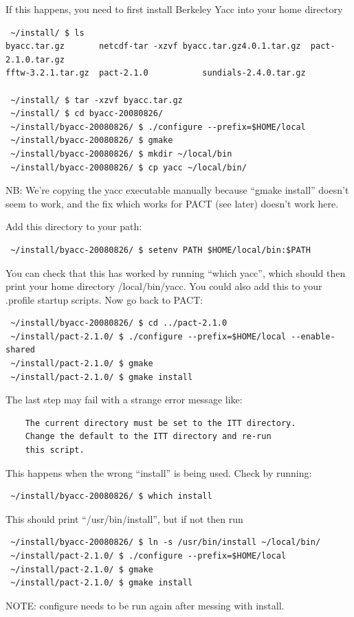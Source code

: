 \documentclass[12pt]{article}
\begin{document}
If this happens, you need to first install Berkeley Yacc into your home directory
\begin{verbatim}
 ~/install/ $ ls
byacc.tar.gz       netcdf-tar -xzvf byacc.tar.gz4.0.1.tar.gz  pact-2.1.0.tar.gz
fftw-3.2.1.tar.gz  pact-2.1.0           sundials-2.4.0.tar.gz

 ~/install/ $ tar -xzvf byacc.tar.gz
 ~/install/ $ cd byacc-20080826/
 ~/install/byacc-20080826/ $ ./configure --prefix=$HOME/local
 ~/install/byacc-20080826/ $ gmake
 ~/install/byacc-20080826/ $ mkdir ~/local/bin
 ~/install/byacc-20080826/ $ cp yacc ~/local/bin/
\end{verbatim}
NB: We're copying the yacc executable manually because ``gmake install'' doesn't seem to work,
and the fix which works for PACT (see later) doesn't work here.

Add this directory to your path:
\begin{verbatim}
 ~/install/byacc-20080826/ $ setenv PATH $HOME/local/bin:$PATH
\end{verbatim}
You can check that this has worked by running ``which yacc'', which should then print
your home directory /local/bin/yacc.
You could also add this to your .profile startup scripts. Now go back to PACT:
\begin{verbatim}
 ~/install/byacc-20080826/ $ cd ../pact-2.1.0
 ~/install/pact-2.1.0/ $ ./configure --prefix=$HOME/local --enable-shared
 ~/install/pact-2.1.0/ $ gmake
 ~/install/pact-2.1.0/ $ gmake install
\end{verbatim}

The last step may fail with a strange error message like:
\begin{verbatim}
    The current directory must be set to the ITT directory.
    Change the default to the ITT directory and re-run
    this script.
\end{verbatim}
This happens when the wrong ``install'' is being used. Check by running:
\begin{verbatim}
 ~/install/byacc-20080826/ $ which install
\end{verbatim}
This should print ``/usr/bin/install'', but if not then run
\begin{verbatim}
 ~/install/byacc-20080826/ $ ln -s /usr/bin/install ~/local/bin/
 ~/install/pact-2.1.0/ $ ./configure --prefix=$HOME/local
 ~/install/pact-2.1.0/ $ gmake
 ~/install/pact-2.1.0/ $ gmake install
\end{verbatim}
NOTE: configure needs to be run again after messing with install.
\end{document}
